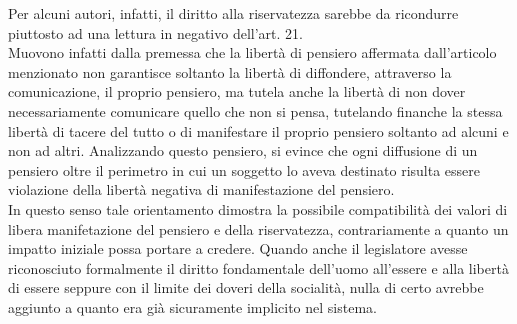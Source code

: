 Per alcuni autori, infatti, il diritto alla riservatezza sarebbe da ricondurre piuttosto ad una lettura in negativo dell'art. 21.
\\Muovono infatti dalla premessa che la libertà di pensiero affermata dall'articolo menzionato non garantisce soltanto la libertà di diffondere, attraverso la comunicazione, il proprio pensiero, ma tutela anche la libertà di non dover necessariamente comunicare quello che non si pensa, tutelando finanche la stessa libertà di tacere del tutto o di  manifestare il proprio pensiero soltanto ad alcuni e non ad altri. Analizzando questo pensiero, si evince che ogni diffusione di un pensiero oltre il perimetro in cui un soggetto lo aveva destinato risulta essere violazione della libertà negativa di manifestazione del pensiero.
\\In questo senso  tale orientamento dimostra la possibile compatibilità dei valori di libera manifetazione del pensiero e della riservatezza, contrariamente a quanto un impatto iniziale possa portare a credere.
Quando anche il legislatore avesse riconosciuto formalmente il diritto fondamentale dell'uomo all'essere e alla libertà di essere seppure con il limite dei doveri della socialità, nulla di certo avrebbe aggiunto a quanto era già sicuramente implicito nel sistema.


